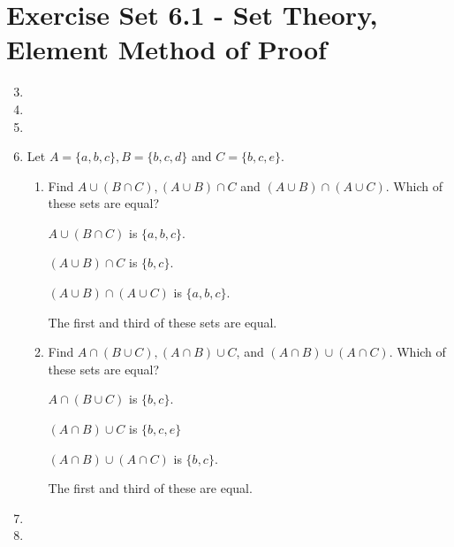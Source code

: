 \documentclass[12pt]{article}
\begin{document}

\setcounter{section}{6}
\section*{Exercise Set 6.1 - Set Theory, Element Method of Proof}
\begin{enumerate}
  \setcounter{enumi}{2}
\item %
  \setcounter{enumi}{4}
\item %
  \setcounter{enumi}{8}
\item %
  \setcounter{enumi}{15}
\item %
Let $A = \{a,b,c\}, B = \{b,c,d\}$ and $C = \{b,c,e\}$.
\begin{enumerate}
\item Find $A \cup (B \cap C), (A \cup B) \cap C$ and $(A \cup B) \cap (A \cup C)$. Which of these sets are
  equal?

$A \cup (B \cap C)$ is $\{a,b,c\}$.

$(A \cup B) \cap C$ is $\{b,c\}$.

$(A \cup B) \cap (A \cup C)$ is $\{a,b,c\}$.

The first and third of these sets are equal.
\item Find $A \cap (B \cup C), (A \cap B) \cup C$, and $(A \cap B) \cup (A \cap C)$. Which of these sets are
  equal?

$A \cap (B \cup C)$ is $\{b,c\}$.

$(A \cap B) \cup C$ is $\{b,c,e\}$

$(A \cap B) \cup (A \cap C)$ is $\{b,c\}$.

The first and third of these are equal.

\end{enumerate}
  \setcounter{enumi}{18}
\item %
  \setcounter{enumi}{21}
\item %
\end{enumerate}
\end{document}

